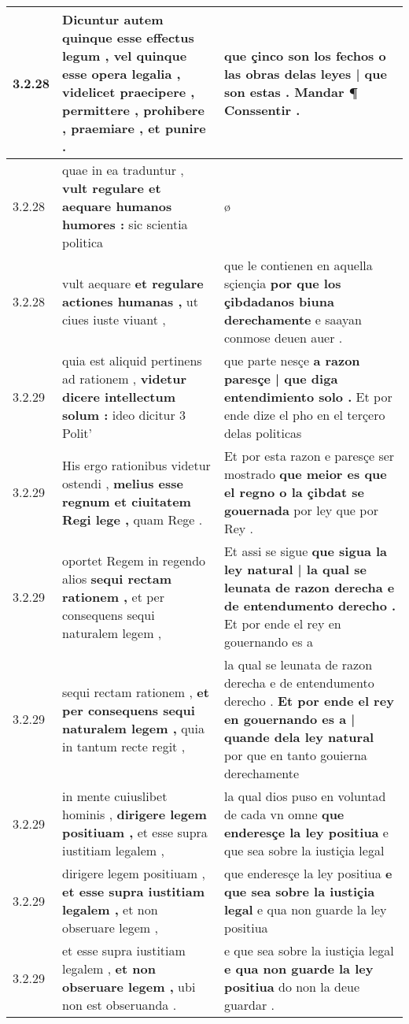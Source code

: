\begin{tabular}{|p{1cm}|p{6.5cm}|p{6.5cm}|}
3.2.28 & Dicuntur autem quinque esse effectus legum , \textbf{ vel quinque esse opera legalia , } videlicet praecipere , permittere , prohibere , praemiare , et punire . & que çinco son los fechos \textbf{ o las obras delas leyes | que son estas . } Mandar ¶ Conssentir . \\\hline
3.2.28 & quae in ea traduntur , \textbf{ vult regulare et aequare humanos humores : } sic scientia politica & ø \\\hline
3.2.28 & vult aequare \textbf{ et regulare actiones humanas , } ut ciues iuste viuant , & que le contienen en aquella sçiençia \textbf{ por que los çibdadanos biuna derechamente } e saayan conmose deuen auer . \\\hline
3.2.29 & quia est aliquid pertinens ad rationem , \textbf{ videtur dicere intellectum solum : } ideo dicitur 3 Polit’ & que parte nesçe \textbf{ a razon paresçe | que diga entendimiento solo . } Et por ende dize el pho en el terçero delas politicas \\\hline
3.2.29 & His ergo rationibus videtur ostendi , \textbf{ melius esse regnum et ciuitatem Regi lege , } quam Rege . & Et por esta razon e paresçe ser mostrado \textbf{ que meior es que el regno o la çibdat se gouernada } por ley que por Rey . \\\hline
3.2.29 & oportet Regem in regendo alios \textbf{ sequi rectam rationem , } et per consequens sequi naturalem legem , & Et assi se sigue \textbf{ que sigua la ley natural | la qual se leunata de razon derecha e de entendumento derecho . } Et por ende el rey en gouernando es a \\\hline
3.2.29 & sequi rectam rationem , \textbf{ et per consequens sequi naturalem legem , } quia in tantum recte regit , & la qual se leunata de razon derecha e de entendumento derecho . \textbf{ Et por ende el rey en gouernando es a | quande dela ley natural } por que en tanto gouierna derechamente \\\hline
3.2.29 & in mente cuiuslibet hominis , \textbf{ dirigere legem positiuam , } et esse supra iustitiam legalem , & la qual dios puso en voluntad de cada vn omne \textbf{ que enderesçe la ley positiua } e que sea sobre la iustiçia legal \\\hline
3.2.29 & dirigere legem positiuam , \textbf{ et esse supra iustitiam legalem , } et non obseruare legem , & que enderesçe la ley positiua \textbf{ e que sea sobre la iustiçia legal } e qua non guarde la ley positiua \\\hline
3.2.29 & et esse supra iustitiam legalem , \textbf{ et non obseruare legem , } ubi non est obseruanda . & e que sea sobre la iustiçia legal \textbf{ e qua non guarde la ley positiua } do non la deue guardar . \\\hline

\end{tabular}
